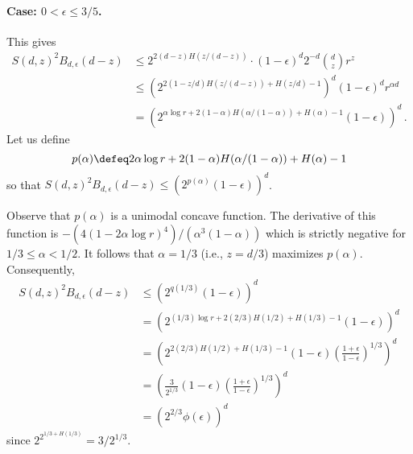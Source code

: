  \paragraph{Case: $0 < \epsilon \leq 3/5$.} 
  This gives
  \begin{align*}
  S(d, z)^2 B_{d,\epsilon}(d-z) 
  &\leq 2^{2(d-z)H(z/(d-z))} \cdot (1-\epsilon)^d 2^{-d} {d \choose z}  r^{z} \\
  &\leq \left( 2^{2(1-z/d)H(z/(d-z)) + H(z/d) - 1} \right)^d (1-\epsilon)^d r^{\alpha d} \\
   &= \left( 2^{ \alpha \log r + 2(1-\alpha)H(\alpha/(1 - \alpha)) + H(\alpha) - 1} (1-\epsilon) \right)^d 
  \,.
  \end{align*}
  Let us define 
  \[
      p(\alpha) \defeq 2 \alpha \log r + 2(1-\alpha)H(\alpha/(1 - \alpha)) + H(\alpha) - 1 
  \]
  so that 
  $
      S(d, z)^2 B_{d,\epsilon}(d-z) \leq \left(2^{p(\alpha)} (1-\epsilon) \right)^d
  $.

  Observe that $p(\alpha)$ is a unimodal concave function. 
  The derivative of this function is
  $
      -\left(4(1-2\alpha \log r)^4\right)/\left(\alpha^3(1-\alpha) \right)
  $
  which is strictly negative for $1/3 \leq \alpha < 1/2$. 
  It follows that $\alpha = 1/3$ (i.e., $z = d/3$) maximizes $p(\alpha)$. 
  Consequently,
  \begin{align*}
  S(d, z)^2 B_{d,\epsilon}(d-z)
  &\leq \left(2^{q(1/3)} (1-\epsilon) \right)^d \\
  &= \left( 2^{(1/3)\log r + 2(2/3)H(1/2) + H(1/3) - 1}  (1-\epsilon) \right)^d \\
  &= \left( 2^{2(2/3)H(1/2) + H(1/3) - 1}  (1-\epsilon)
   \left(\frac{1+\epsilon}{1-\epsilon}\right)^{1/3} \right)^d \\
  &= \left( \frac{3}{2^{1/3}}  (1-\epsilon)
   \left(\frac{1+\epsilon}{1-\epsilon}\right)^{1/3} \right)^d \\
   &= \left(2^{2/3} \phi(\epsilon) \right)^d 
  \end{align*}
  since $2^{2^{1/3 + H(1/3)}} = 3/2^{1/3}$.

